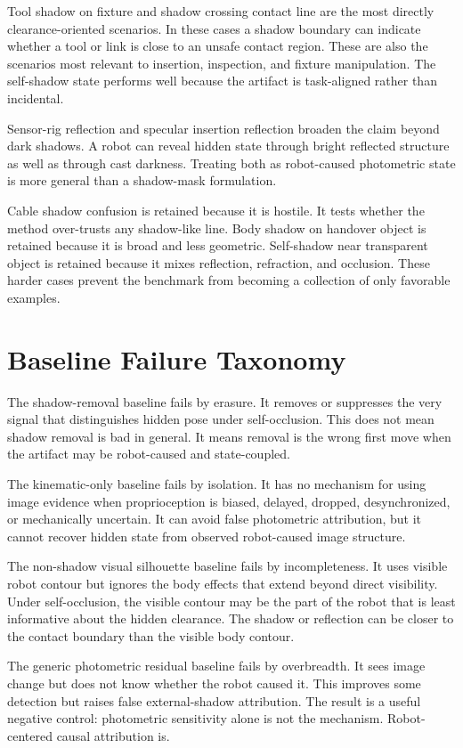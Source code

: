 \documentclass{article}
\begin{document}
Tool shadow on fixture and shadow crossing contact line are the most directly clearance-oriented scenarios. In these cases a shadow boundary can indicate whether a tool or link is close to an unsafe contact region. These are also the scenarios most relevant to insertion, inspection, and fixture manipulation. The self-shadow state performs well because the artifact is task-aligned rather than incidental.

Sensor-rig reflection and specular insertion reflection broaden the claim beyond dark shadows. A robot can reveal hidden state through bright reflected structure as well as through cast darkness. Treating both as robot-caused photometric state is more general than a shadow-mask formulation.

Cable shadow confusion is retained because it is hostile. It tests whether the method over-trusts any shadow-like line. Body shadow on handover object is retained because it is broad and less geometric. Self-shadow near transparent object is retained because it mixes reflection, refraction, and occlusion. These harder cases prevent the benchmark from becoming a collection of only favorable examples.

\clearpage
\section{Baseline Failure Taxonomy}

The shadow-removal baseline fails by erasure. It removes or suppresses the very signal that distinguishes hidden pose under self-occlusion. This does not mean shadow removal is bad in general. It means removal is the wrong first move when the artifact may be robot-caused and state-coupled.

The kinematic-only baseline fails by isolation. It has no mechanism for using image evidence when proprioception is biased, delayed, dropped, desynchronized, or mechanically uncertain. It can avoid false photometric attribution, but it cannot recover hidden state from observed robot-caused image structure.

The non-shadow visual silhouette baseline fails by incompleteness. It uses visible robot contour but ignores the body effects that extend beyond direct visibility. Under self-occlusion, the visible contour may be the part of the robot that is least informative about the hidden clearance. The shadow or reflection can be closer to the contact boundary than the visible body contour.

The generic photometric residual baseline fails by overbreadth. It sees image change but does not know whether the robot caused it. This improves some detection but raises false external-shadow attribution. The result is a useful negative control: photometric sensitivity alone is not the mechanism. Robot-centered causal attribution is.
\end{document}
